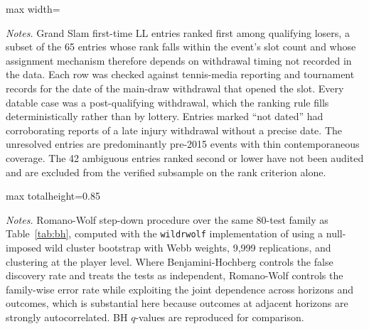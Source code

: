 \begin{table}[htbp]
\centering
\caption{News Audit of Ambiguous Lucky Loser Assignments}
\label{tab:news_audit}
\begin{threeparttable}
\scriptsize
\begin{adjustbox}{max width=\textwidth}

\end{adjustbox}
\begin{tablenotes}
\footnotesize
\item \textit{Notes.} Grand Slam first-time LL entries ranked first among qualifying losers, a subset of the 65 entries whose rank falls within the event's slot count and whose assignment mechanism therefore depends on withdrawal timing not recorded in the data. Each row was checked against tennis-media reporting and tournament records for the date of the main-draw withdrawal that opened the slot. Every datable case was a post-qualifying withdrawal, which the ranking rule fills deterministically rather than by lottery. Entries marked ``not dated'' had corroborating reports of a late injury withdrawal without a precise date. The unresolved entries are predominantly pre-2015 events with thin contemporaneous coverage. The 42 ambiguous entries ranked second or lower have not been audited and are excluded from the verified subsample on the rank criterion alone.
\end{tablenotes}
\end{threeparttable}
\end{table}


\begin{table}[!p]
\centering
\caption{Romano-Wolf Step-Down $p$-Values Across Primary Outcomes}
\label{tab:romano_wolf}
\begin{threeparttable}
\scriptsize
\begin{adjustbox}{max totalheight=0.85\textheight}

\end{adjustbox}
\begin{tablenotes}
\footnotesize
\item \textit{Notes.} Romano-Wolf step-down procedure \citep{RomanoWolf2005_stepdown} over the same 80-test family as Table~\ref{tab:bh}, computed with the \texttt{wildrwolf} implementation of \citet{Clarke2020_romanowolf} using a null-imposed wild cluster bootstrap with Webb weights, 9{,}999 replications, and clustering at the player level. Where Benjamini-Hochberg controls the false discovery rate and treats the tests as independent, Romano-Wolf controls the family-wise error rate while exploiting the joint dependence across horizons and outcomes, which is substantial here because outcomes at adjacent horizons are strongly autocorrelated. BH $q$-values are reproduced for comparison.
\end{tablenotes}
\end{threeparttable}
\end{table}

